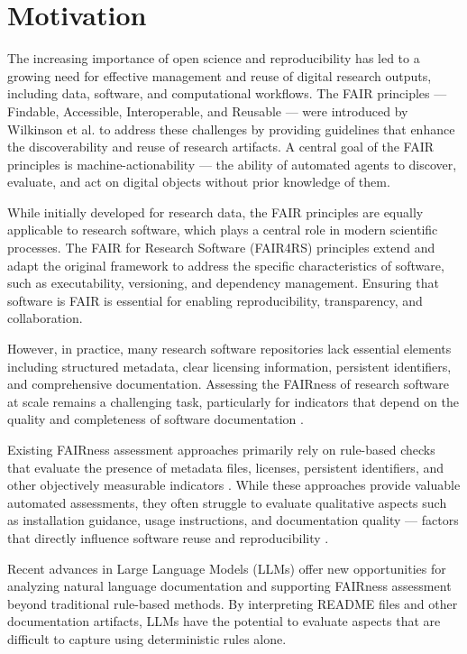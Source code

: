 \section{Motivation}

The increasing importance of open science and reproducibility has 
led to a growing need for effective management and reuse of digital 
research outputs, including data, software, and computational 
workflows. The FAIR principles — Findable, Accessible, Interoperable, 
and Reusable — were introduced by Wilkinson et al. \cite{wilkinson2016fair} 
to address these challenges by providing guidelines that enhance the 
discoverability and reuse of research artifacts. A central goal of 
the FAIR principles is machine-actionability — the ability of 
automated agents to discover, evaluate, and act on digital objects 
without prior knowledge of them.

While initially developed for research data, the FAIR principles are 
equally applicable to research software, which plays a central role 
in modern scientific processes. The FAIR for Research Software 
(FAIR4RS) principles \cite{barker2022fair4rs} extend and adapt the 
original framework to address the specific characteristics of 
software, such as executability, versioning, and dependency 
management. Ensuring that software is FAIR is essential for enabling 
reproducibility, transparency, and collaboration.

However, in practice, many research software repositories lack 
essential elements including structured metadata, clear licensing 
information, persistent identifiers, and comprehensive documentation. 
Assessing the FAIRness of research software at scale remains a 
challenging task, particularly for indicators that depend on the 
quality and completeness of software documentation 
\cite{chuehong2025frsm}.

Existing FAIRness assessment approaches primarily rely on rule-based 
checks that evaluate the presence of metadata files, licenses, 
persistent identifiers, and other objectively measurable indicators 
\cite{fuji2021}. While these approaches provide valuable automated 
assessments, they often struggle to evaluate qualitative aspects such 
as installation guidance, usage instructions, and documentation 
quality — factors that directly influence software reuse and 
reproducibility \cite{chuehong2025frsm}.

Recent advances in Large Language Models (LLMs) offer new 
opportunities for analyzing natural language documentation and 
supporting FAIRness assessment beyond traditional rule-based methods. 
By interpreting README files and other documentation artifacts, LLMs have the potential to evaluate aspects that are difficult to capture using deterministic rules alone.

